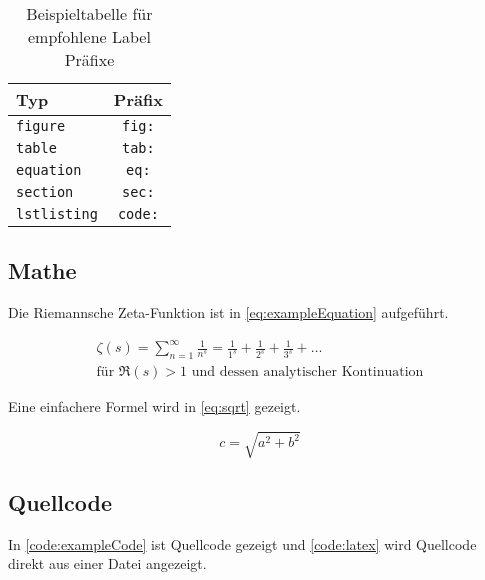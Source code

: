 \begin{table}[ht]
    \centering
    \begin{tabular}{|l|c|}
        \hline
        \textbf{Typ} & \textbf{Präfix} \\
        \hline \hline
        \texttt{figure} & \texttt{fig:} \\
        \texttt{table} & \texttt{tab:} \\
        \texttt{equation} & \texttt{eq:} \\
        \texttt{section} & \texttt{sec:} \\
        \texttt{lstlisting} & \texttt{code:} \\
        \hline
    \end{tabular}
    \caption{Beispieltabelle für empfohlene Label Präfixe}
    \label{tab:prefix-table}
\end{table}

\subsection{Mathe}

Die Riemannsche Zeta-Funktion ist in \autoref{eq:exampleEquation} aufgeführt.

\begin{equation}
    \begin{gathered}
        \zeta(s) = \sum_{n=1}^{\infty} \frac{1}{n^s} = \frac{1}{1^s} + \frac{1}{2^s} + \frac{1}{3^s} + \ldots \\[2ex]
        \text{für } \Re(s) > 1 \text{ und dessen analytischer Kontinuation}
    \end{gathered}
    \label{eq:exampleEquation}
\end{equation}

Eine einfachere Formel wird in \autoref{eq:sqrt} gezeigt.

\begin{equation}
    c = \sqrt{a^{2} + b^{2}}
    \label{eq:sqrt}
\end{equation}

\subsection{Quellcode}


In \autoref{code:exampleCode} ist Quellcode gezeigt und \autoref{code:latex} wird Quellcode direkt aus einer Datei angezeigt.

